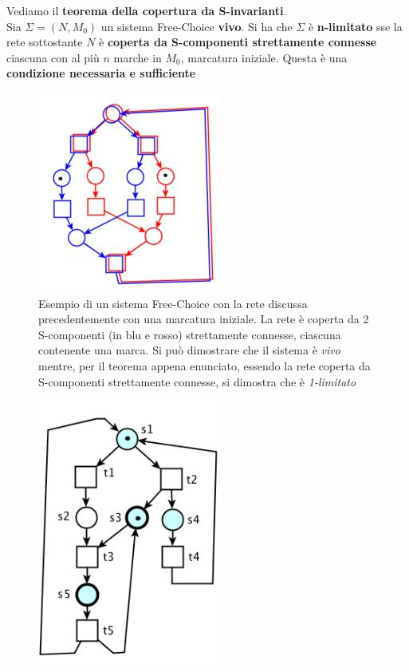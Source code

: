 \documentclass[a4paper,12pt, oneside]{book}
\begin{document}
\newpage
\begin{teorema}
  Vediamo il \textbf{teorema della copertura da S-invarianti}.\\
  Sia $\Sigma=(N,M_0)$ un sistema Free-Choice \textbf{vivo}. Si ha che $\Sigma$
  è \textbf{n-limitato} sse la rete sottostante $N$ è \textbf{coperta da
    S-componenti strettamente connesse} ciascuna con al più $n$ marche in $M_0$,
  marcatura iniziale. Questa è una \textbf{condizione necessaria e sufficiente}
  \begin{figure}[H]
    \centering
    \includegraphics[scale = 0.5]{img/fc12.jpg}
    \caption{Esempio di un sistema Free-Choice con la rete discussa
      precedentemente con una marcatura iniziale. La rete è coperta da 2
      S-componenti (in blu e rosso) strettamente connesse, ciascuna contenente
      una marca. Si può dimostrare che il sistema è \emph{vivo} mentre, per il
      teorema appena enunciato, essendo la rete coperta da S-componenti
      strettamente connesse, si dimostra che è \emph{1-limitato}}  
  \end{figure}
  \begin{figure}[H]
    \centering
    \includegraphics[scale = 0.45]{img/fc13.jpg}

\end{figure}
\end{teorema}
\end{document}

